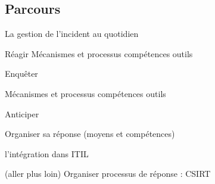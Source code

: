 \subsection{Parcours}


La gestion de l'incident au quotidien 

Réagir 
	Mécanismes et processus
	compétences
	outils

Enquêter

	Mécanismes et processus
	compétences
	outils

Anticiper

Organiser sa réponse (moyens et compétences)

      l'intégration dans ITIL

(aller plus loin) Organiser  processus de réponse : CSIRT







